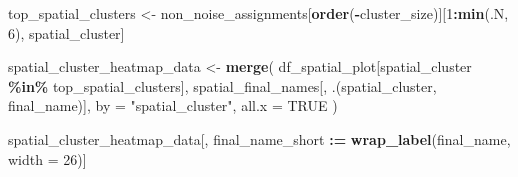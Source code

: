 \documentclass[
]{article}
\newenvironment{Shaded}{\begin{snugshade}}{\end{snugshade}}
\newcommand{\AttributeTok}[1]{\textcolor[rgb]{0.13,0.29,0.53}{#1}}
\newcommand{\ConstantTok}[1]{\textcolor[rgb]{0.56,0.35,0.01}{#1}}
\newcommand{\DecValTok}[1]{\textcolor[rgb]{0.00,0.00,0.81}{#1}}
\newcommand{\FunctionTok}[1]{\textcolor[rgb]{0.13,0.29,0.53}{\textbf{#1}}}
\newcommand{\NormalTok}[1]{#1}
\newcommand{\OtherTok}[1]{\textcolor[rgb]{0.56,0.35,0.01}{#1}}
\newcommand{\SpecialCharTok}[1]{\textcolor[rgb]{0.81,0.36,0.00}{\textbf{#1}}}
\newcommand{\StringTok}[1]{\textcolor[rgb]{0.31,0.60,0.02}{#1}}
\begin{document}
\begin{Shaded}
\begin{Highlighting}[]
\NormalTok{top\_spatial\_clusters }\OtherTok{\textless{}{-}}\NormalTok{ non\_noise\_assignments[}\FunctionTok{order}\NormalTok{(}\SpecialCharTok{{-}}\NormalTok{cluster\_size)][}\DecValTok{1}\SpecialCharTok{:}\FunctionTok{min}\NormalTok{(.N, }\DecValTok{6}\NormalTok{), spatial\_cluster]}

\NormalTok{spatial\_cluster\_heatmap\_data }\OtherTok{\textless{}{-}} \FunctionTok{merge}\NormalTok{(}
\NormalTok{  df\_spatial\_plot[spatial\_cluster }\SpecialCharTok{\%in\%}\NormalTok{ top\_spatial\_clusters],}
\NormalTok{  spatial\_final\_names[, .(spatial\_cluster, final\_name)],}
  \AttributeTok{by =} \StringTok{"spatial\_cluster"}\NormalTok{,}
  \AttributeTok{all.x =} \ConstantTok{TRUE}
\NormalTok{)}

\NormalTok{spatial\_cluster\_heatmap\_data[, final\_name\_short }\SpecialCharTok{:=} \FunctionTok{wrap\_label}\NormalTok{(final\_name, }\AttributeTok{width =} \DecValTok{26}\NormalTok{)]}


\end{Highlighting}
\end{Shaded}
\end{document}

